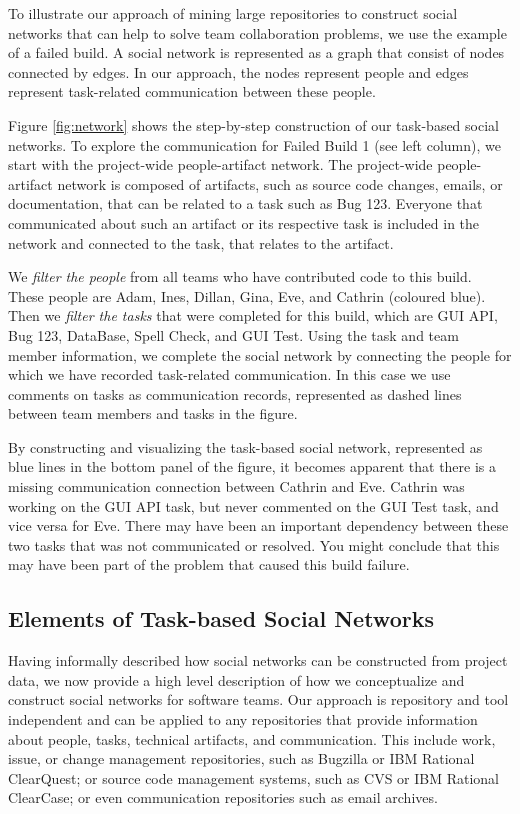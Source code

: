 \documentclass[12pt,oneside]{book}
\begin{document}
To illustrate our approach of mining large repositories to construct social
networks that can help to solve team collaboration problems, we use the example
of a failed build. A social network is represented as a graph that consist of
nodes connected by edges. In our approach, the nodes represent people and edges
represent task-related communication between these people.

Figure \ref{fig:network} shows the step-by-step construction of our task-based
social networks. To explore the communication for Failed Build 1 (see left
column), we start with the project-wide people-artifact network. 
%
The project-wide people-artifact network is composed of artifacts, such as 
source code changes, emails, or documentation, that can be related to a task such as Bug 123.
Everyone that communicated about such an artifact or its respective task is included in the network
and connected to the task, that relates to the artifact.
%

We \emph{filter the people} from all teams who have contributed code to this
build. These people are Adam, Ines, Dillan, Gina, Eve, and Cathrin (coloured
blue). Then we \emph{filter the tasks} that were completed for this build, which
are GUI API, Bug 123, DataBase, Spell Check, and GUI Test. Using the task and
team member information, we complete the social network by connecting the people
for which we have recorded task-related communication. In this case we use
comments on tasks as communication records, represented as dashed lines between
team members and tasks in the figure.

By constructing and visualizing the task-based social network, represented as
blue lines in the bottom panel of the figure, it becomes apparent that there is a
missing communication connection between Cathrin and Eve. Cathrin was working on
the GUI API task, but never commented on the GUI Test task, and vice versa for
Eve. There may have been an important dependency between these two tasks that was
not communicated or resolved. You might conclude that this may have been part of
the problem that caused this build failure.

\subsection{Elements of Task-based Social Networks} 
Having informally described how social networks can be constructed from project
data, we now provide a high level description of how we conceptualize and
construct social networks for software teams. Our approach is repository and tool
independent and can be applied to any repositories that provide information about
people, tasks, technical artifacts, and communication. This include work, issue,
or change management repositories, such as Bugzilla or IBM Rational
ClearQuest\texttrademark; or source code management systems, such as CVS or IBM
Rational ClearCase\texttrademark; or even communication repositories such as
email archives.
\end{document}
